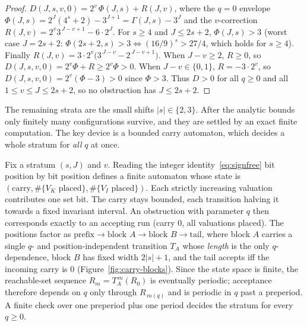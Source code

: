 \documentclass[11pt,reqno]{amsart}
\newcommand{\Vk}{V_{K}}
\newcommand{\Vi}{V_{I}}
\begin{document}
\begin{proof}
$D(J,s,v,0) = 2^{v}\,\Phi(J,s) + R(J,v)$, where the $q=0$ envelope
$\Phi(J,s) = 2^{J}(4^{s}+2) - 3^{J+1} = \Gamma(J,s) - 3^{J}$ and the
$v$-correction $R(J,v) = 2^{v} 3^{\,J-v+1} - 6\cdot 2^{J}$.
For $s \ge 4$ and $J \le 2s+2$, $\Phi(J,s) > 3$ (worst case $J = 2s+2$:
$\Phi(2s+2,s) > 3 \iff (16/9)^{s} > 27/4$, which holds for $s \ge 4$). Finally
$R(J,v) = 3\cdot 2^{v}\bigl(3^{\,J-v} - 2^{\,J-v+1}\bigr)$. When $J - v \ge 2$,
$R \ge 0$, so $D(J,s,v,0) = 2^{v}\Phi + R \ge 2^{v}\Phi > 0$. When
$J - v \in \{0,1\}$, $R = -3\cdot 2^{v}$, so
$D(J,s,v,0) = 2^{v}(\Phi - 3) > 0$ since $\Phi > 3$. Thus $D > 0$ for all $q \ge 0$ and all
$1 \le v \le J \le 2s+2$, so no obstruction has $J \le 2s+2$.
\qedhere
\end{proof}

The remaining strata are the small shifts $|s| \in \{2,3\}$. After the analytic
bounds only finitely many configurations survive, and they are settled by an
exact finite computation. The key device is a bounded carry automaton, which
decides a whole stratum for \emph{all} $q$ at once.

\begin{lemma}\label{lem:carry-automaton}
Fix a stratum $(s, J)$ and $v$. Reading the integer
identity~\eqref{eq:signfree} bit position by bit position defines a finite
automaton whose state is $(\text{carry}, \#\{\Vk\text{ placed}\}, \#\{\Vi\text{ placed}\})$.
Each strictly increasing valuation contributes one set bit. The carry stays
bounded, each transition halving it towards a fixed invariant interval. An
obstruction with parameter $q$ then corresponds exactly to an accepting run
(carry $0$, all valuations placed). The positions factor as $\text{prefix} \to \text{block } A
\to \text{block } B \to \text{tail}$, where block $A$ carries a single
$q$- and position-independent transition $T_A$ whose \emph{length} is the only
$q$-dependence, block $B$ has fixed width $2|s|+1$, and the tail accepts iff the
incoming carry is $0$ (Figure~\ref{fig:carry-blocks}). Since the state space is
finite, the reachable-set sequence $R_m = T_A^{\,m}(R_0)$ is eventually periodic;
acceptance therefore depends on $q$ only through $R_{\,m(q)}$ and is periodic in
$q$ past a preperiod. A finite check over one preperiod plus one period decides
the stratum for every $q \ge 0$.
\end{lemma}
\end{document}
